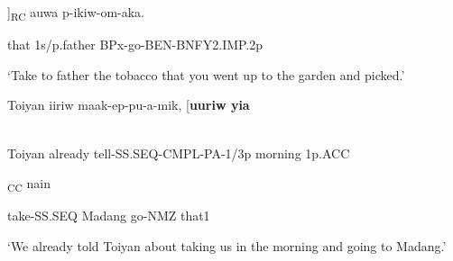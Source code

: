 ]\textsubscript{RC}  auwa  p-ikiw-om-aka.

that  1s/p.father  BPx-go-BEN-BNFY2.IMP.2p

`Take to father the tobacco that you went up to the garden and picked.'

\ea%
\label{ex:x1848}
\gll Toiyan  iiriw  maak-ep-pu-a-mik,  [\textbf{uuriw  yia} \\
      \\
\glt
\z

Toiyan  already  tell-SS.SEQ-CMPL-PA-1/3p  morning  1p.ACC

\textstyleEmphasizedVernacularWords{aaw-ep  Madang  ikiw-owa]}\textsubscript{CC} \textstyleEmphasizedVernacularWords{} nain

take-SS.SEQ  Madang  go-NMZ  that1

`We already told Toiyan about taking us in the morning and going to Madang.' 

